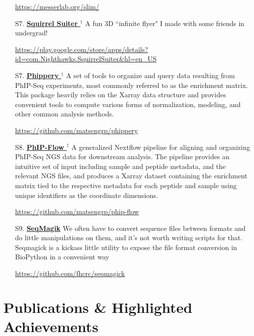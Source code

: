 \documentclass[letterpaper,11pt]{article}
\let\oldhref\href
\renewcommand{\href}[2]{\oldhref{#1}{\bfseries#2}}
\begin{document}
\begin{enumerate}
        \space \url{https://messerlab.org/slim/}

\item [S7.] \href{https://play.google.com/store/apps/details?id=com.Nighthawks.SquirrelSuiter&hl=en_US}{Squirrel Suiter $^{\dagger}$} 
        \space \space A fun 3D ``infinite flyer" I made with some friends in undergrad! 
        
        \space \url{https://play.google.com/store/apps/details?id=com.Nighthawks.SquirrelSuiter&hl=en_US}


\item [S7.] \href{https://github.com/matsengrp/phippery}{Phippery $^{\dagger}$} 
        \space \space A set of tools to organize and query data resulting from PhIP-Seq experiments, most commonly 
        referred to as the enrichment matrix.
        This package heavily relies on the Xarray data structure and provides convenient tools to compute
        various forms of normalization, modeling, and other common analysis methods.
        
        \space \url{https://github.com/matsengrp/phippery}


\item [S8.] \href{https://github.com/matsengrp/phip-flow}{PhIP-Flow $^{\dagger}$}
        \space \space A generalized Nextflow pipeline for aligning and organizing PhIP-Seq NGS data for downstream analysis.
        The pipeline provides an intuitive set of input including sample and peptide metadata, and the relevant NGS files,
        and produces a Xarray dataset containing the enrichment matrix tied to the respective metadata for each peptide and sample using unique
        identifiers as the coordinate dimensions. 

        \space \url{https://github.com/matsengrp/phip-flow}

\item [S9.] \href{https://github.com/fhcrc/seqmagick}{SeqMagik}
        \space \space We often have to convert sequence files between formats and do little manipulations on them, 
        and it's not worth writing scripts for that. 
        Seqmagick is a kickass little utility to expose the file format conversion in BioPython in a convenient way

        \space \url{https://github.com/fhcrc/seqmagick}



\end{enumerate}

\section{Publications \& Highlighted Achievements}
%
\end{document}
